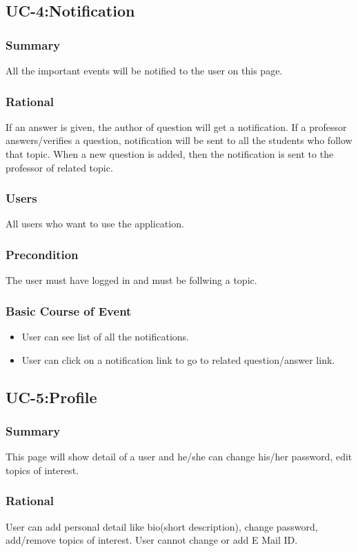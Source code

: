 \documentclass[journal,12pt,onecolumn,draftclsnofoot,]{IEEEtran}
\begin{document}
\subsection{UC-4:Notification}
\subsubsection{Summary}
All the important events will be notified to the user on this page.
\subsubsection{Rational}
If an answer is given, the author of question will get a notification. If a professor answers/verifies a question, notification will be sent to all the students who follow that topic. When a new question is added, then the notification is sent to the professor of related topic.
\subsubsection{Users}
All users who want to use the application.
\subsubsection{Precondition}
The user must have logged in and must be follwing a topic.
\subsubsection{Basic Course of Event}
\begin{itemize}
\item User can see list of all the notifications.
\item User can click on a notification link to go to related question/answer link.
\end{itemize}

\subsection{UC-5:Profile}
\subsubsection{Summary}
This page will show detail of a user and he/she can change his/her password, edit topics of interest.
\subsubsection{Rational}
User can add personal detail like bio(short description), change password, add/remove topics of interest. User cannot change or add E Mail ID.
\end{document}
